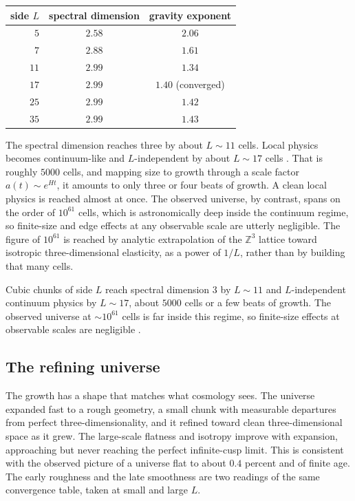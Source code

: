 \begin{table}[h]
\centering
\begin{tabular}{rcc}
\toprule
side $L$ & spectral dimension & gravity exponent \\
\midrule
$5$  & $2.58$ & $2.06$ \\
$7$  & $2.88$ & $1.61$ \\
$11$ & $2.99$ & $1.34$ \\
$17$ & $2.99$ & $1.40$ (converged) \\
$25$ & $2.99$ & $1.42$ \\
$35$ & $2.99$ & $1.43$ \\
\bottomrule
\end{tabular}
\end{table}

The spectral dimension reaches three by about $L \sim 11$ cells. Local physics becomes continuum-like and
$L$-independent by about $L \sim 17$ cells \cite{pollard2026vibetest}. That is roughly $5000$ cells, and mapping
size to growth through a scale factor $a(t) \sim e^{Ht}$, it amounts to only three or four beats of growth. A
clean local physics is reached almost at once. The observed universe, by contrast, spans on the order of
$10^{61}$ cells, which is astronomically deep inside the continuum regime, so finite-size and edge effects at any
observable scale are utterly negligible. The figure of $10^{61}$ is reached by analytic extrapolation of the
$\mathbb{Z}^3$ lattice toward isotropic three-dimensional elasticity, as a power of $1/L$, rather than by
building that many cells.

\begin{result}
Cubic chunks of side $L$ reach spectral dimension $3$ by $L \sim 11$ and $L$-independent continuum physics by
$L \sim 17$, about $5000$ cells or a few beats of growth. The observed universe at $\sim 10^{61}$ cells is far
inside this regime, so finite-size effects at observable scales are negligible \cite{pollard2026vibetest}.
\end{result}

\subsection{The refining universe}

The growth has a shape that matches what cosmology sees. The universe expanded fast to a rough geometry, a small
chunk with measurable departures from perfect three-dimensionality, and it refined toward clean three-dimensional
space as it grew. The large-scale flatness and isotropy improve with expansion, approaching but never reaching
the perfect infinite-cusp limit. This is consistent with the observed picture of a universe flat to about
$0.4$ percent and of finite age. The early roughness and the late smoothness are two readings of the same
convergence table, taken at small and large $L$.

